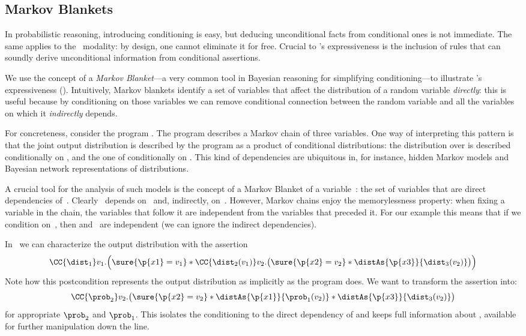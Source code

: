 \documentclass[acmsmall,nonacm,screen,appendix]{acmart}
\begin{document}
\subsection{Markov Blankets}
\label{sec:ex:markov-blanket}

In probabilistic reasoning, introducing conditioning is easy,
but deducing unconditional facts from conditional ones is not immediate.
The same applies to the \supercond\ modality: by design, one cannot eliminate it for free.
Crucial to \thelogic's expressiveness is the inclusion of rules that can
soundly derive unconditional information from conditional assertions.

We use the concept of a \emph{Markov Blanket}---a very common tool in Bayesian reasoning
  for simplifying conditioning---to illustrate \thelogic's expressiveness ().
Intuitively, Markov blankets identify a set of variables that affect the distribution of a random variable \emph{directly}:
this is useful because by conditioning on those variables
we can remove conditional connection between the random variable
and all the variables on which it \emph{indirectly} depends.


For concreteness, consider the program
.
The program describes a Markov chain of three variables.
One way of interpreting this pattern is that the joint output distribution
is described by the program as a product of conditional distributions:
the distribution over  is described conditionally on ,
and the one of  conditionally on .
This kind of dependencies are ubiquitous in, for instance, hidden Markov models and Bayesian network representations of distributions.

A crucial tool for the analysis of such models is the concept of a
Markov Blanket of a variable~: the set of variables that are direct dependencies of~.
Clearly~ depends on~ and, indirectly, on~.
However, Markov chains enjoy the memorylessness property:
when fixing a variable in the chain, the variables that follow it are independent from the variables that preceded it.
For our example this means that if we condition on~, then
 and~ are independent (\ie we can ignore the indirect dependencies).

In \thelogic\ we can characterize the output distribution with the assertion
\[
  \CC{\dist_1} v_1. \Bigl(
    \sure{\p{x1}=v_1} *
    \CC{\dist_2(v_1)} v_2. \bigl(
      \sure{\p{x2}=v_2} *
      \distAs{\p{x3}}{\dist_3(v_2)}
    \bigr)
  \Bigr)
\]
Note how this postcondition represents the output distribution
as implicitly as the program does.
We want to transform the assertion into:
\[
  \CC{\prob_2} v_2.
  \bigl(
    \sure{\p{x2}=v_2} *
    \distAs{\p{x1}}{\prob_1(v_2)} *
    \distAs{\p{x3}}{\dist_3(v_2)}
  \bigr)
\]
for appropriate $\prob_2$ and $\prob_1$.
This isolates the conditioning to the direct dependency of 
and keeps full information about ,
available for further manipulation down the line.
\end{document}
